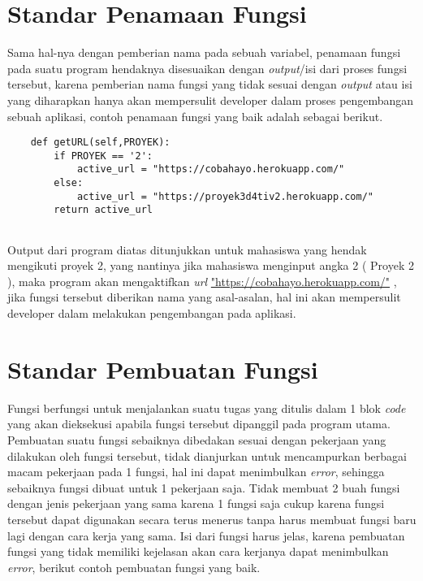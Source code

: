 \section{Standar Penamaan Fungsi}
\par 
Sama hal-nya dengan pemberian nama pada sebuah variabel, penamaan fungsi pada suatu program hendaknya disesuaikan dengan \textit{output}/isi dari proses fungsi tersebut, karena pemberian nama fungsi yang tidak sesuai dengan \textit{output} atau isi yang diharapkan hanya akan mempersulit developer dalam proses pengembangan sebuah aplikasi, contoh penamaan fungsi yang baik adalah sebagai berikut.

\begin{verbatim}
	def getURL(self,PROYEK):
		if PROYEK == '2':
			active_url = "https://cobahayo.herokuapp.com/"
		else:
			active_url = "https://proyek3d4tiv2.herokuapp.com/"
		return active_url
		
\end{verbatim}

\par 
Output dari program diatas ditunjukkan untuk mahasiswa yang hendak mengikuti proyek 2, yang nantinya jika mahasiswa menginput angka 2 ( Proyek 2 ), maka program akan mengaktifkan \textit{url} \url{"https://cobahayo.herokuapp.com/"} , jika fungsi tersebut diberikan nama yang asal-asalan, hal ini akan mempersulit developer dalam melakukan pengembangan pada aplikasi.

\section{Standar Pembuatan Fungsi}
\par 
Fungsi berfungsi untuk menjalankan suatu tugas yang ditulis dalam 1 blok \textit{code} yang akan dieksekusi apabila fungsi tersebut dipanggil pada program utama. Pembuatan suatu fungsi sebaiknya dibedakan sesuai dengan pekerjaan yang dilakukan oleh fungsi tersebut, tidak dianjurkan untuk mencampurkan berbagai macam pekerjaan pada 1 fungsi, hal ini dapat menimbulkan \textit{error}, sehingga sebaiknya fungsi dibuat untuk 1 pekerjaan saja. Tidak membuat 2 buah fungsi dengan jenis pekerjaan yang sama karena 1 fungsi saja cukup karena fungsi tersebut dapat digunakan secara terus menerus tanpa harus membuat fungsi baru lagi dengan cara kerja yang sama. Isi dari fungsi harus jelas, karena pembuatan fungsi yang tidak memiliki kejelasan akan cara kerjanya dapat menimbulkan \textit{error}, berikut contoh pembuatan fungsi yang baik.

